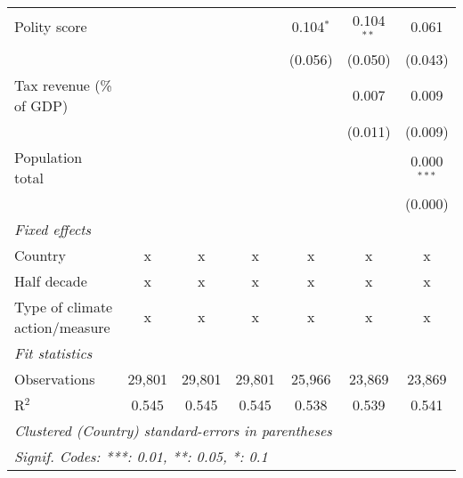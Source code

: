 \begin{tabular}{lcccccc}
   Polity score                                                        &         &         &               & 0.104$^{*}$   & 0.104$^{**}$  & 0.061\\   
                                                                       &         &         &               & (0.056)       & (0.050)       & (0.043)\\   
   Tax revenue (\% of GDP)                                             &         &         &               &               & 0.007         & 0.009\\   
                                                                       &         &         &               &               & (0.011)       & (0.009)\\   
   Population total                                                    &         &         &               &               &               & 0.000$^{***}$\\   
                                                                       &         &         &               &               &               & (0.000)\\   
   \emph{Fixed effects}\\
   Country                                                             & x       & x       & x             & x             & x             & x\\  
   Half decade                                                         & x       & x       & x             & x             & x             & x\\  
   Type of climate action/measure                                      & x       & x       & x             & x             & x             & x\\  
   \midrule \emph{Fit statistics}\\
   Observations                                                        & 29,801  & 29,801  & 29,801        & 25,966        & 23,869        & 23,869\\  
   R$^2$                                                               & 0.545   & 0.545   & 0.545         & 0.538         & 0.539         & 0.541\\  
   \midrule
   \multicolumn{7}{l}{\emph{Clustered (Country) standard-errors in parentheses}}\\
   \multicolumn{7}{l}{\emph{Signif. Codes: ***: 0.01, **: 0.05, *: 0.1}}\\
\end{tabular}
\par\endgroup


